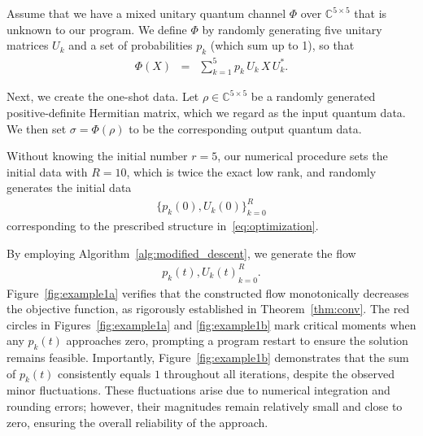 \documentclass[onefignum,onetabnum]{siamart220329}
\begin{document}
    
    Assume that we have a mixed unitary quantum channel $\Phi$ over $\mathbb{C}^{5\times 5}$ that is unknown to our program. We define $\Phi$ by randomly generating five unitary matrices $U_k$ and a set of probabilities $p_k$ (which sum up to 1), so that
    \begin{eqnarray*}
    \Phi(X) &=& \sum_{k=1}^5 p_k \, U_k \, X \, U_k^*.
    \end{eqnarray*}
    
    Next, we create the one-shot data. Let $\rho \in \mathbb{C}^{5 \times 5}$ be a randomly generated positive-definite Hermitian matrix, which we regard as the input quantum data. We then set $\sigma = \Phi(\rho)$ to be the corresponding output quantum data. {\color{blue} Without knowing the initial number $r = 5$, our numerical procedure sets the initial data with $R = 10$, which is twice the exact low rank, and randomly generates the initial data  
\begin{eqnarray*}  
\{p_k(0), U_k(0)\}_{k=0}^{R}  
\end{eqnarray*}  
corresponding to the prescribed structure in~\eqref{eq:optimization}.

%
%
%
%
%
 By employing Algorithm~\ref{alg:modified_descent}, we generate the flow
 \begin{eqnarray*}
 {p_k(t), U_k(t)}_{k=0}^{R}.
 \end{eqnarray*}
 Figure~\ref{fig:example1a} verifies that the constructed flow monotonically decreases the objective function, as rigorously established in Theorem~\ref{thm:conv}. The red circles in Figures~\ref{fig:example1a} and \ref{fig:example1b} mark critical moments when any $p_k(t)$ approaches zero, prompting a program restart to ensure the solution remains feasible. Importantly, Figure~\ref{fig:example1b} demonstrates that the sum of $p_k(t)$ consistently equals $1$ throughout all iterations, despite the observed minor fluctuations. These fluctuations arise due to numerical integration and rounding errors; however, their magnitudes remain relatively small and close to zero, ensuring the overall reliability of the approach.
    
}
\end{document}
